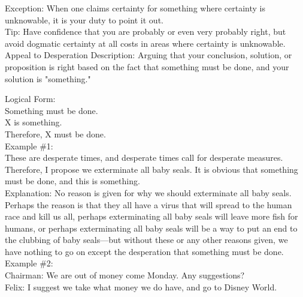 \documentclass[a4paper,12pt,single,pdftex]{scrbook}
\begin{document}
    
      Exception: When one claims certainty for something where certainty is unknowable, it is your duty to point it out.
    \\

    
      Tip: Have confidence that you are probably or even very probably right, but avoid dogmatic certainty at all costs in areas where certainty is unknowable.
    \\

  

Appeal to Desperation
    Description: Arguing that your conclusion, solution, or proposition is right based on the fact that something must be done, and your solution is "something."

    
      Logical Form:
    \\

    
      Something must be done.
    \\

    
      X is something.
    \\

    
      Therefore, X must be done.
    \\

    
      Example \#1:
    \\

    
      These are desperate times, and desperate times call for desperate measures.  Therefore, I propose we exterminate all baby seals.  It is obvious that something must be done, and this is something.
    \\

    
      Explanation: No reason is given for why we should exterminate all baby seals.  Perhaps the reason is that they all have a virus that will spread to the human race and kill us all, perhaps exterminating all baby seals will leave more fish for humans, or perhaps exterminating all baby seals will be a way to put an end to the clubbing of baby seals—but without these or any other reasons given, we have nothing to go on except the desperation that something must be done.
    \\

    
      Example \#2:
    \\

    
      Chairman: We are out of money come Monday.  Any suggestions?
    \\

    
      Felix: I suggest we take what money we do have, and go to Disney World.
    \\
\end{document}
